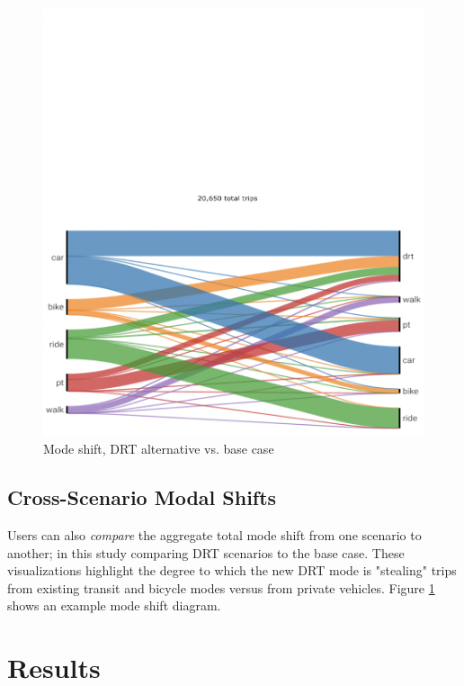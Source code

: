 \begin{figure}[ht]
\begin{minipage}[c]{0.45\textwidth}
     \includegraphics[width=\linewidth]{chapters/22-avov/images/fig-mode-share.png}
     \caption{Mode shift, DRT alternative vs. base case}
     \label{fig:avov-modeshift}
  \end{minipage}
\end{figure}

\subsection{Cross-Scenario Modal Shifts}
\label{avov-mode-shifts}

Users can also \emph{compare} the aggregate total mode shift from one scenario to another; in this study comparing DRT scenarios to the base case. These visualizations highlight the degree to which the new DRT mode is "stealing" trips from existing transit and bicycle modes versus from private vehicles. Figure \ref{fig:avov-modeshift} shows an example mode shift diagram.

\section{Results}
\label{avov-results}

